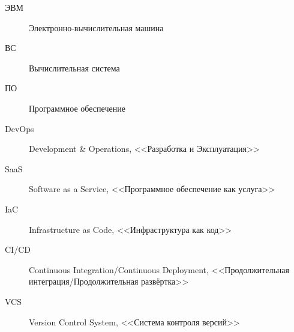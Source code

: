 \Abbreviations %
\begin{description}
    \item[ЭВМ] Электронно-вычислительная машина
    \item[ВС] Вычислительная система
    \item[ПО] Программное обеспечение
    \item[DevOps] Development & Operations, <<Разработка и Эксплуатация>>
    \item[SaaS] Software as a Service, <<Программное обеспечение как услуга>>
    \item[IaC] Infrastructure as Code, <<Инфраструктура как код>>
    \item[CI/CD] Continuous Integration/Continuous Deployment, <<Продолжительная интеграция/Продолжительная развёртка>>
    \item[VCS] Version Control System, <<Система контроля версий>>
\end{description}

